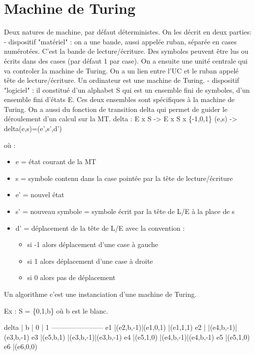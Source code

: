\documentclass{article}
\begin{document}
\section{Machine de Turing}

Deux natures de machine, par défaut déterministes.
On les décrit en deux parties:
    - dispositif "matériel" : on a une bande, aussi appelée ruban, séparée en cases numérotées. C'est la bande de lecture/écriture. Des symboles peuvent être lus ou écrits dans des cases (par défaut 1 par case). On a ensuite une unité centrale qui va controler la machine de Turing. On a un lien entre l'UC et le ruban appelé tête de lecture/écriture. Un ordinateur est une machine de Turing.
    - dispositif "logiciel" : il constitué d'un alphabet S qui est un ensemble fini de symboles, d'un ensemble fini d'états E. Ces deux ensembles sont spécifiques à la machine de Turing. On a aussi du fonction de transition delta qui permet de guider le déroulement d'un calcul sur la MT. 
        delta : E x S -> E x S x \{-1,0,1\}
	        (e,s) -> delta(e,s)=(e',s',d')

	où :\begin{itemize}
	    \item[] e = état courant de la MT
	    \item[] s = symbole contenu dans la case pointée par la tête de lecture/écriture
	    \item[] e' = nouvel état
	    \item[] s' = nouveau symbole = symbole écrit par la tête de L/E à la place de s
	    \item[] d' = déplacement de la tête de L/E avec la convention :
	    \begin{itemize}
	        \item[] si -1 alors déplacement d'une case à gauche
		\item[] si  1 alors déplacement d'une case à droite
		\item[] si  0 alors pas de déplacement
	    \end{itemize}
	\end{itemize}

Un algorithme c'est une instanciation d'une machine de Turing.

Ex : S = \{0,1,b\} où b est le blanc.

delta |    b    |    0    |    1
-----------------------
  e1  |(e2,b,-1)|(e1,0,1) |(e1,1,1)
  e2  |         |(e4,b,-1)|(e3,b,-1)
  e3  |(e5,b,1) |(e3,b,-1)|(e3,b,-1)
  e4  |(e5,1,0) |(e4,b,-1)|(e4,b,-1)
  e5  |(e5,1,0)
  e6  |(e6,0,0)
	    
\end{document}
